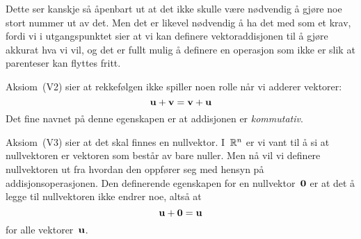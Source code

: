 Dette ser kanskje så åpenbart ut at det ikke skulle være nødvendig å
gjøre noe stort nummer ut av det.  Men det er likevel nødvendig å ha
det med som et krav, fordi vi i utgangspunktet sier at vi kan definere
vektoraddisjonen til å gjøre akkurat hva vi vil, og det er fullt mulig
å definere en operasjon som ikke er slik at parenteser kan flyttes
fritt.

Aksiom~(V2) sier at rekkefølgen ikke spiller noen rolle når vi adderer
vektorer:
\[
\mathbf{u} + \mathbf{v} = \mathbf{v} + \mathbf{u}
\]
Det fine navnet på denne egenskapen er at addisjonen er
\emph{kommutativ}.

Aksiom~(V3) sier at det skal finnes en nullvektor.  I~$\mathbb{R}^n$ er vi
vant til å si at nullvektoren er vektoren som består av bare nuller.
Men nå vil vi definere nullvektoren ut fra hvordan den oppfører seg
med hensyn på addisjonsoperasjonen.  Den definerende egenskapen for en
nullvektor~$\mathbf{0}$ er at det å legge til nullvektoren ikke endrer noe,
altså at
\[
\mathbf{u} + \mathbf{0} = \mathbf{u}
\]
for alle vektorer~$\mathbf{u}$.


